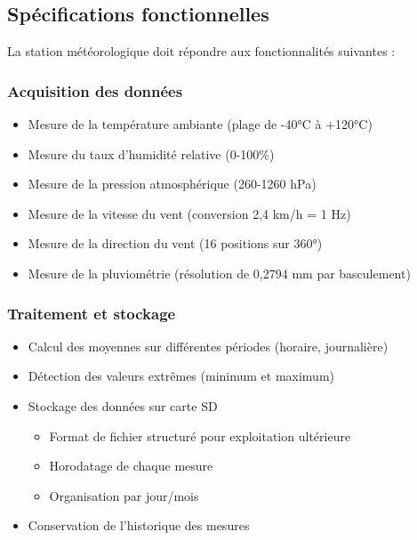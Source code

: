 \documentclass[12pt]{article}
\begin{document}
\subsection{Spécifications fonctionnelles}

La station météorologique doit répondre aux fonctionnalités suivantes :

\subsubsection{Acquisition des données}
\begin{itemize}
    \item Mesure de la température ambiante (plage de -40°C à +120°C)
    \item Mesure du taux d'humidité relative (0-100\%)
    \item Mesure de la pression atmosphérique (260-1260 hPa)
    \item Mesure de la vitesse du vent (conversion 2,4 km/h = 1 Hz)
    \item Mesure de la direction du vent (16 positions sur 360°)
    \item Mesure de la pluviométrie (résolution de 0,2794 mm par basculement)
\end{itemize}

\subsubsection{Traitement et stockage}
\begin{itemize}
    \item Calcul des moyennes sur différentes périodes (horaire, journalière)
    \item Détection des valeurs extrêmes (minimum et maximum)
    \item Stockage des données sur carte SD
    \begin{itemize}
        \item Format de fichier structuré pour exploitation ultérieure
        \item Horodatage de chaque mesure
        \item Organisation par jour/mois
    \end{itemize}
    \item Conservation de l'historique des mesures
\end{itemize}
\end{document}
